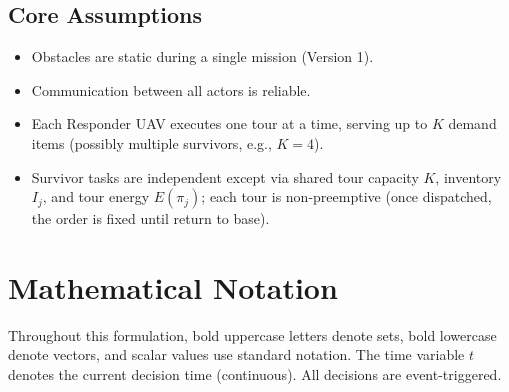 \documentclass[conference]{IEEEtran}
\begin{document}
\subsection{Core Assumptions}
\begin{itemize}
\item Obstacles are static during a single mission (Version 1).
\item Communication between all actors is reliable.
\item Each Responder UAV executes one tour at a time, serving up to $K$ demand items (possibly multiple survivors, e.g., $K=4$).
\item Survivor tasks are independent except via shared tour capacity $K$, inventory $I_j$, and tour energy $E(\pi_j)$; each tour is non-preemptive (once dispatched, the order is fixed until return to base).
\end{itemize}

\section{Mathematical Notation}
Throughout this formulation, bold uppercase letters denote sets, bold lowercase denote vectors, and scalar values use standard notation. The time variable $t$ denotes the current decision time (continuous). All decisions are event-triggered.
\end{document}

